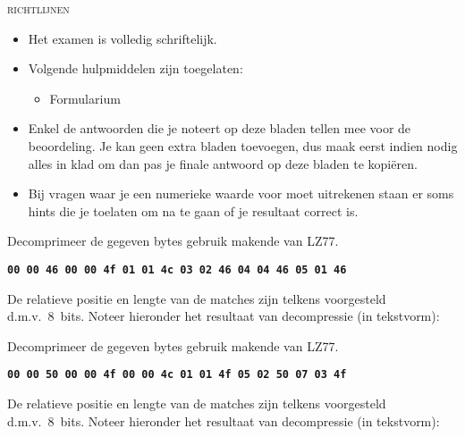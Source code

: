 \documentclass[]{pvm-exam}
\newcommand{\hex}[1]{\texttt{\bfseries #1}}
\begin{document}
\begin{examguidelines}
  \begin{center}
    \textsc{\Huge richtlijnen}
  \end{center}
  \vskip1cm
  \Large
  \begin{itemize}
    \item Het examen is volledig schriftelijk.
    \item Volgende hulpmiddelen zijn toegelaten:
          \begin{itemize}
            \item Formularium
          \end{itemize}
    \item Enkel de antwoorden die je noteert op deze bladen
          tellen mee voor de beoordeling. Je kan geen extra bladen
          toevoegen, dus maak eerst indien nodig alles in klad om dan pas
          je finale antwoord op deze bladen te kopi\"eren.
    \item Bij vragen waar je een numerieke waarde voor moet uitrekenen
          staan er soms hints die je toelaten om na te gaan of je resultaat correct is.
  \end{itemize}
\end{examguidelines}







\begin{question}
  Decomprimeer de gegeven bytes gebruik makende van LZ77.
  \begin{center}
    \hex{00 00 46 00 00 4f 01 01 4c 03 02 46 04 04 46 05 01 46}
  \end{center}
  De relatieve positie en lengte van de matches zijn telkens voorgesteld d.m.v.~8~bits.
  Noteer hieronder het resultaat van decompressie (in tekstvorm):
  \vskip5mm
  \begin{center}
  \end{center}
\end{question}

\begin{question}
  Decomprimeer de gegeven bytes gebruik makende van LZ77.
  \begin{center}
    \hex{00 00 50 00 00 4f 00 00 4c 01 01 4f 05 02 50 07 03 4f}
  \end{center}
  De relatieve positie en lengte van de matches zijn telkens voorgesteld d.m.v.~8~bits.
  Noteer hieronder het resultaat van decompressie (in tekstvorm):
  \vskip5mm
  \begin{center}
  \end{center}
\end{question}
\end{document}

